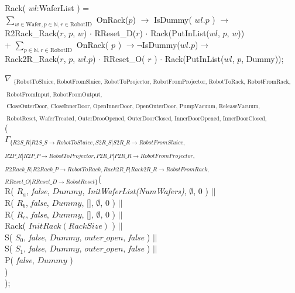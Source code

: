 \documentclass[12pt]{report}
\begin{document}
	{\small
	\phantom{---} Rack( $wl$:WaferList ) =\\
	\phantom{-------} $\sum\nolimits_{w\in \text{Wafer}, p \in \mathbb{N}, r \in \text{RobotID}}$ OnRack($p$) $\rightarrow$ IsDummy( $wl.p$ ) $\rightarrow$\\
	\phantom{-----------} R2Rack\_Rack($r$, $p$, $w$) $\cdot$ RReset\_D($r$) $\cdot$ Rack(PutInList($wl$, $p$, $w$))\\
	\phantom{-------} + $\sum\nolimits_{p \in \mathbb{N}, r \in \text{RobotID}}$ OnRack( $p$ ) $\rightarrow \neg$IsDummy($wl.p$)$\rightarrow$\\
	\phantom{-----------} Rack2R\_Rack($r$, $p$, $wl.p$) $\cdot$ RReset\_O( $r$ ) $\cdot$ Rack(PutInList($wl$, $p$, Dummy));
	}
	
	$\nabla_{\text{ \{RobotToSluice, RobotFromSluice, RobotToProjector, RobotFromProjector, RobotToRack, RobotFromRack,}}$\\
	\phantom{--} $_{ \text{ RobotFromInput, RobotFromOutput,}}$\\
	\phantom{--} $_{ \text{ CloseOuterDoor, CloseInnerDoor, OpenInnerDoor, OpenOuterDoor, PumpVacuum, ReleaseVacuum,}}$\\
	\phantom{--} $_{ \text{ RobotReset, WaferTreated, OuterDrooOpened, OuterDoorClosed, InnerDoorOpened, InnerDoorClosed, VacuumDone, VacuumReleased, SluiceBroken\}}}$(\\
	\phantom{---} $\Gamma_{\{R2S\_R|R2S\_S\rightarrow RobotToSluice,S2R\_S|S2R\_R\rightarrow RobotFromSluice,}$\\
	\phantom{-----} $_{ R2P\_R|R2P\_P\rightarrow RobotToProjector, P2R\_P|P2R\_R\rightarrow RobotFromProjector,}$\\
	\phantom{-----} $_{ R2Rack\_R|R2Rack\_P\rightarrow RobotToRack, Rack2R\_P|Rack2R\_R\rightarrow RobotFromRack,}$\\
	\phantom{-----} $_{ RReset\_O|RReset\_D\rightarrow RobotReset \}}$(\\
	\phantom{---------} R( $R_a$, \emph{false}, $Dummy$, \emph{InitWaferList(NumWafers)}, $\emptyset$, 0 ) $||$\\
	\phantom{---------} R( $R_b$, \emph{false}, $Dummy$, [], $\emptyset$, 0 ) $||$\\
	\phantom{---------} R( $R_c$, \emph{false}, $Dummy$, [], $\emptyset$, 0 ) $||$\\
	\phantom{---------} Rack( $InitRack(RackSize)$ ) $||$\\
	\phantom{---------} S( $S_0$, \emph{false}, $Dummy$, $outer\_open$, \emph{false} ) $||$\\
	\phantom{---------} S( $S_1$, \emph{false}, $Dummy$, $outer\_open$, \emph{false} ) $||$\\
	\phantom{---------} P( \emph{false}, $Dummy$ )\\
	\phantom{---} )\\
	);
	
\end{document}
